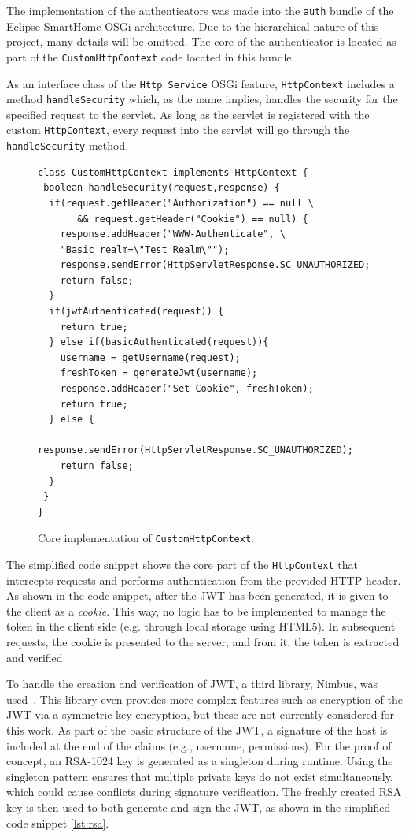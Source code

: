 \documentclass[12pt]{article}
\newcommand{\TODO}{\todo[inline]}
\begin{document}
The implementation of the authenticators was made into the \texttt{auth} bundle of the Eclipse SmartHome OSGi architecture. Due to the hierarchical nature of this project, many details will be omitted.  The core of the authenticator is located as part of the \texttt{CustomHttpContext} code located in this bundle.

As an interface class of the \texttt{Http Service} OSGi feature, \texttt{HttpContext} includes a method \texttt{handleSecurity} which, as the name implies, handles the security for the specified request to the servlet. As long as the servlet is registered with the custom \texttt{HttpContext}, every request into the servlet will go through the \texttt{handleSecurity} method.

\TODO{FIX HYPHEN ISSUES AND REF TO CODE SNIPPET INSTEAD OF FIG}
\begin{figure} [htb]
  \begin{lstlisting}
class CustomHttpContext implements HttpContext {   
 boolean handleSecurity(request,response) {
  if(request.getHeader("Authorization") == null \
       && request.getHeader("Cookie") == null) {
    response.addHeader("WWW-Authenticate", \
	"Basic realm=\"Test Realm\"");
    response.sendError(HttpServletResponse.SC_UNAUTHORIZED;
    return false;
  }	    
  if(jwtAuthenticated(request)) {
    return true;		
  } else if(basicAuthenticated(request)){
    username = getUsername(request);
    freshToken = generateJwt(username);
    response.addHeader("Set-Cookie", freshToken);
    return true;
  } else {
    response.sendError(HttpServletResponse.SC_UNAUTHORIZED);
    return false;
  }
 }
}
\end{lstlisting}
\caption{Core implementation of \texttt{CustomHttpContext}.}
\label{lst:core_impl}
\end{figure}

The simplified code snippet shows the core part of the \texttt{HttpContext} that intercepts requests and performs authentication from the provided HTTP header. As shown in the code snippet, after the JWT has been generated, it is given to the client as a \emph{cookie}. This way, no logic has to be implemented to manage the token in the client side (e.g. through local storage using HTML5). In subsequent requests, the cookie is presented to the server, and from it, the token is extracted and verified.

To handle the creation and verification of JWT, a third library, Nimbus, was used~\cite{nimbus}. This library even provides more complex features such as encryption of the JWT via a symmetric key encryption, but these are not currently considered for this work. As part of the basic structure of the JWT, a signature of the host is included at the end of the claims (e.g., username, permissions). For the proof of concept, an RSA-1024 key is generated as a singleton during runtime. Using the singleton pattern ensures that multiple private keys do not exist simultaneously, which could cause conflicts during signature verification. The freshly created RSA key is then used to both generate and sign the JWT, as shown in the simplified code snippet \ref{lst:rsa}.
\end{document}
